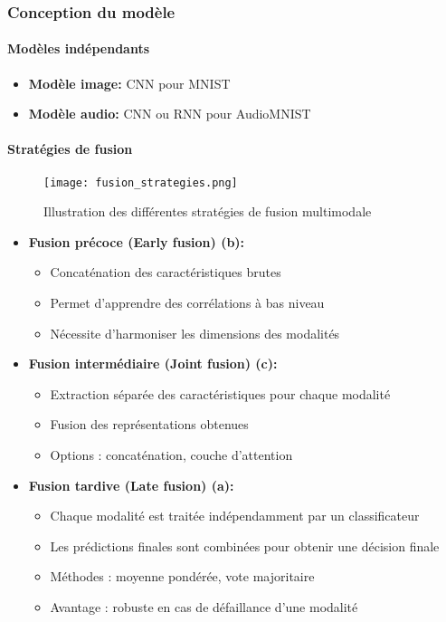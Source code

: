\documentclass[11pt,a4paper]{article}
\begin{document}
\subsubsection{Conception du modèle}
\label{subsubsec:conception}

\paragraph{Modèles indépendants}
\begin{itemize}
    \item \textbf{Modèle image:} CNN pour MNIST
    \item \textbf{Modèle audio:} CNN ou RNN pour AudioMNIST
\end{itemize}

\paragraph{Stratégies de fusion}

\begin{figure}[H]
    \centering
    \texttt{[image: fusion\_strategies.png]}
    \caption{Illustration des différentes stratégies de fusion multimodale}
    \label{fig:fusion}
\end{figure}

\begin{itemize}
    \item \textbf{Fusion précoce (Early fusion) (b):}
    \begin{itemize}
        \item Concaténation des caractéristiques brutes
        \item Permet d'apprendre des corrélations à bas niveau
        \item Nécessite d'harmoniser les dimensions des modalités
    \end{itemize}
    
    \item \textbf{Fusion intermédiaire (Joint fusion) (c):}
    \begin{itemize}
        \item Extraction séparée des caractéristiques pour chaque modalité
        \item Fusion des représentations obtenues
        \item Options : concaténation, couche d'attention
    \end{itemize}
    
    \item \textbf{Fusion tardive (Late fusion) (a):}
    \begin{itemize}
        \item Chaque modalité est traitée indépendamment par un classificateur
        \item Les prédictions finales sont combinées pour obtenir une décision finale
        \item Méthodes : moyenne pondérée, vote majoritaire
        \item Avantage : robuste en cas de défaillance d’une modalité
    \end{itemize}    
\end{itemize}
\end{document}

